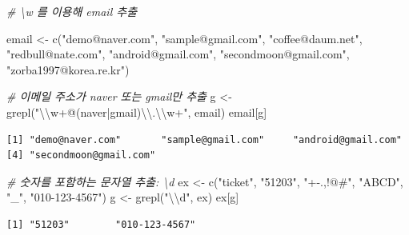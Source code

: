 \documentclass[
  11pt,
]{krantz}
\newenvironment{Shaded}{\begin{snugshade}}{\end{snugshade}}
\newcommand{\CommentTok}[1]{\textcolor[rgb]{0.37,0.37,0.37}{\textit{#1}}}
\newcommand{\FunctionTok}[1]{\textcolor[rgb]{0,0,0}{#1}}
\newcommand{\NormalTok}[1]{#1}
\newcommand{\OtherTok}[1]{\textcolor[rgb]{0.37,0.37,0.37}{#1}}
\newcommand{\SpecialCharTok}[1]{\textcolor[rgb]{0,0,0}{#1}}
\newcommand{\StringTok}[1]{\textcolor[rgb]{0.5,0.5,0.5}{#1}}
\begin{document}
\begin{Shaded}
\begin{Highlighting}[]
\CommentTok{\# \textbackslash{}w 를 이용해 email 추출}

\NormalTok{email }\OtherTok{\textless{}{-}} \FunctionTok{c}\NormalTok{(}\StringTok{"demo@naver.com"}\NormalTok{, }
           \StringTok{"sample@gmail.com"}\NormalTok{, }
           \StringTok{"coffee@daum.net"}\NormalTok{, }
           \StringTok{"redbull@nate.com"}\NormalTok{, }
           \StringTok{"android@gmail.com"}\NormalTok{, }
           \StringTok{"secondmoon@gmail.com"}\NormalTok{, }
           \StringTok{"zorba1997@korea.re.kr"}\NormalTok{)}

\CommentTok{\# 이메일 주소가 naver 또는 gmail만 추출}
\NormalTok{g }\OtherTok{\textless{}{-}} \FunctionTok{grepl}\NormalTok{(}\StringTok{"}\SpecialCharTok{\textbackslash{}\textbackslash{}}\StringTok{w+@(naver|gmail)}\SpecialCharTok{\textbackslash{}\textbackslash{}}\StringTok{.}\SpecialCharTok{\textbackslash{}\textbackslash{}}\StringTok{w+"}\NormalTok{, email)}
\NormalTok{email[g]}
\end{Highlighting}
\end{Shaded}

\begin{verbatim}
[1] "demo@naver.com"       "sample@gmail.com"     "android@gmail.com"   
[4] "secondmoon@gmail.com"
\end{verbatim}

\begin{Shaded}
\begin{Highlighting}[]
\CommentTok{\# 숫자를 포함하는 문자열 추출: \textbackslash{}d}
\NormalTok{ex }\OtherTok{\textless{}{-}} \FunctionTok{c}\NormalTok{(}\StringTok{"ticket"}\NormalTok{, }\StringTok{"51203"}\NormalTok{, }\StringTok{"+{-}.,!@\#"}\NormalTok{, }\StringTok{"ABCD"}\NormalTok{, }\StringTok{"\_"}\NormalTok{, }\StringTok{"010{-}123{-}4567"}\NormalTok{)}
\NormalTok{g }\OtherTok{\textless{}{-}} \FunctionTok{grepl}\NormalTok{(}\StringTok{"}\SpecialCharTok{\textbackslash{}\textbackslash{}}\StringTok{d"}\NormalTok{, ex)}
\NormalTok{ex[g]}
\end{Highlighting}
\end{Shaded}

\begin{verbatim}
[1] "51203"        "010-123-4567"
\end{verbatim}

\begin{Shaded}
\end{Shaded}
\end{document}
